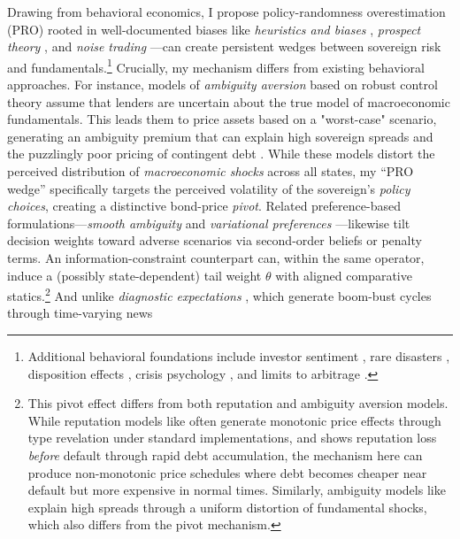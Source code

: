 \documentclass[12pt]{article}
\theoremstyle{plain}
\begin{document}
Drawing from behavioral economics, I propose policy-randomness overestimation
(PRO) rooted in well-documented biases like \textit{heuristics and biases}
\citet{TverskyKahneman1974}, \textit{prospect theory}
\citet{KahnemanTversky1979}, and \textit{noise trading}
\citet{DeLongEtAl1990}---can create persistent wedges between sovereign risk
and fundamentals.\footnote{Additional behavioral foundations include investor
	sentiment \citet{BakerWurgler2006}, rare disasters \citet{Gabaix2012},
	disposition effects \citet{ShefrinStatman1985}, crisis psychology
	\citet{Kindleberger1978}, and limits to arbitrage \citet{BrunnermeierNagel2004,
		BarberisThaler2003}.} Crucially, my mechanism differs from existing behavioral
approaches. For instance, models of \textit{ambiguity aversion} based on robust
control theory \citet{GilboaSchmeidler1989, HansenSargent2008} assume that
lenders are uncertain about the true model of macroeconomic fundamentals. This
leads them to price assets based on a "worst-case" scenario, generating an
ambiguity premium that can explain high sovereign spreads
\citet{PouzoPresno2016} and the puzzlingly poor pricing of contingent debt
\citet{RochRoldan2023}. While these models distort the perceived distribution
of \textit{macroeconomic shocks} across all states, my ``PRO wedge''
specifically targets the perceived volatility of the sovereign's \textit{policy
	choices}, creating a distinctive bond-price \textit{pivot}. Related
preference-based formulations---\textit{smooth ambiguity}
\citet{KlibanoffMarinacciMukerji2005} and \textit{variational preferences}
\citet{MaccheroniMarinacciRustichini2006}---likewise tilt decision weights
toward adverse scenarios via second-order beliefs or penalty terms. An
information-constraint counterpart can, within the same operator, induce a
(possibly state-dependent) tail weight $\theta$ with aligned comparative
statics.\footnote{This pivot effect differs from both reputation and ambiguity
	aversion models. While reputation models like \citet{AmadorPhelan2021} often
	generate monotonic price effects through type revelation under standard
	implementations, and \citet{Fourakis2021} shows reputation loss \textit{before}
	default through rapid debt accumulation, the mechanism here can produce
	non-monotonic price schedules where debt becomes cheaper near default but more
	expensive in normal times. Similarly, ambiguity models like
	\citet{RochRoldan2023} explain high spreads through a uniform distortion of
	fundamental shocks, which also differs from the pivot mechanism.} And unlike
\textit{diagnostic expectations} \citet{GennaioliShleifer2018,
	BordaloEtAl2023}, which generate boom-bust cycles through time-varying news
\end{document}
